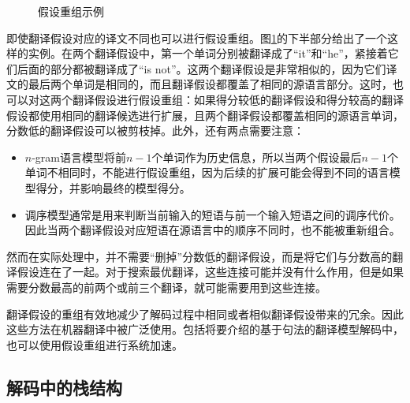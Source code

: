 \begin{figure}[htp]
\centering

\caption{假设重组示例}
\label{fig:7-29}
\end{figure}

\parinterval 即使翻译假设对应的译文不同也可以进行假设重组。图\ref{fig:7-29}的下半部分给出了一个这样的实例。在两个翻译假设中，第一个单词分别被翻译成了“it”和“he”，紧接着它们后面的部分都被翻译成了“is not”。这两个翻译假设是非常相似的，因为它们译文的最后两个单词是相同的，而且翻译假设都覆盖了相同的源语言部分。这时，也可以对这两个翻译假设进行假设重组：如果得分较低的翻译假设和得分较高的翻译假设都使用相同的翻译候选进行扩展，且两个翻译假设都覆盖相同的源语言单词，分数低的翻译假设可以被剪枝掉。此外，还有两点需要注意：

\begin{itemize}
\vspace{0.5em}
\item $n$-gram语言模型将前$n-1$个单词作为历史信息，所以当两个假设最后$n-1$个单词不相同时，不能进行假设重组，因为后续的扩展可能会得到不同的语言模型得分，并影响最终的模型得分。
\vspace{0.5em}
\item 调序模型通常是用来判断当前输入的短语与前一个输入短语之间的调序代价。因此当两个翻译假设对应短语在源语言中的顺序不同时，也不能被重新组合。
\vspace{0.5em}
\end{itemize}

\parinterval 然而在实际处理中，并不需要“删掉”分数低的翻译假设，而是将它们与分数高的翻译假设连在了一起。对于搜索最优翻译，这些连接可能并没有什么作用，但是如果需要分数最高的前两个或前三个翻译，就可能需要用到这些连接。

\parinterval 翻译假设的重组有效地减少了解码过程中相同或者相似翻译假设带来的冗余。因此这些方法在机器翻译中被广泛使用。包括{\chaptereight}将要介绍的基于句法的翻译模型解码中，也可以使用假设重组进行系统加速。


\subsection{解码中的栈结构}

